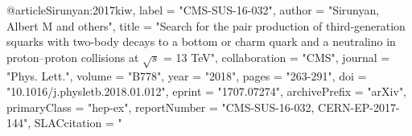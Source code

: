 

@article{Sirunyan:2017kiw,
      label          = "CMS-SUS-16-032",
      author         = "Sirunyan, Albert M and others",
      title          = "{Search for the pair production of third-generation
                        squarks with two-body decays to a bottom or charm quark
                        and a neutralino in proton--proton collisions at
                        $\sqrt{s}$ = 13 TeV}",
      collaboration  = "CMS",
      journal        = "Phys. Lett.",
      volume         = "B778",
      year           = "2018",
      pages          = "263-291",
      doi            = "10.1016/j.physletb.2018.01.012",
      eprint         = "1707.07274",
      archivePrefix  = "arXiv",
      primaryClass   = "hep-ex",
      reportNumber   = "CMS-SUS-16-032, CERN-EP-2017-144",
      SLACcitation   = "%
}

